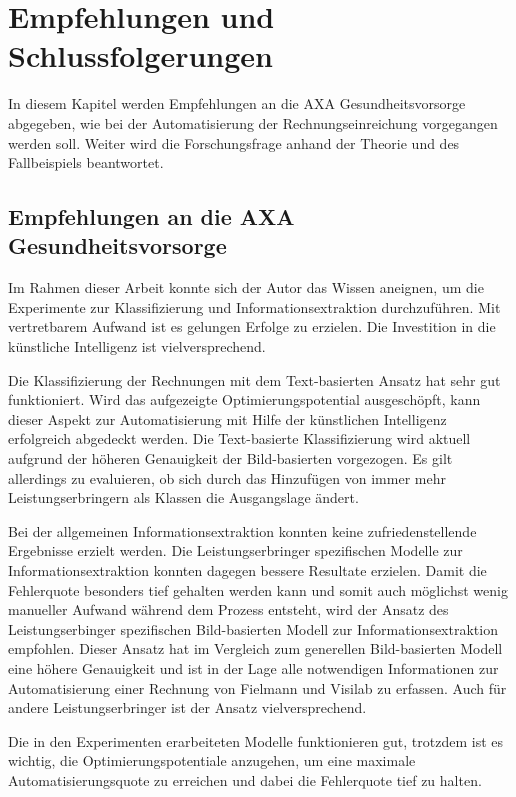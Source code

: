\section{Empfehlungen und Schlussfolgerungen}
\label{chap:summary}

In diesem Kapitel werden Empfehlungen an die AXA Gesundheitsvorsorge abgegeben, wie bei der Automatisierung der Rechnungseinreichung vorgegangen werden soll. Weiter wird die Forschungsfrage anhand der Theorie und des Fallbeispiels beantwortet.

\subsection{Empfehlungen an die AXA Gesundheitsvorsorge}

Im Rahmen dieser Arbeit konnte sich der Autor das Wissen aneignen, um die Experimente zur Klassifizierung und Informationsextraktion durchzuführen. Mit vertretbarem Aufwand ist es gelungen Erfolge zu erzielen. Die Investition in die künstliche Intelligenz ist vielversprechend.

Die Klassifizierung der Rechnungen mit dem Text-basierten Ansatz hat sehr gut funktioniert. Wird das aufgezeigte Optimierungspotential ausgeschöpft, kann dieser Aspekt zur Automatisierung mit Hilfe der künstlichen Intelligenz erfolgreich abgedeckt werden. Die Text-basierte Klassifizierung wird aktuell aufgrund der höheren Genauigkeit der Bild-basierten vorgezogen. Es gilt allerdings zu evaluieren, ob sich durch das Hinzufügen von immer mehr Leistungserbringern als Klassen die Ausgangslage ändert.

Bei der allgemeinen Informationsextraktion konnten keine zufriedenstellende Ergebnisse erzielt werden. Die Leistungserbringer spezifischen Modelle zur Informationsextraktion konnten dagegen bessere Resultate erzielen. Damit die Fehlerquote besonders tief gehalten werden kann und somit auch möglichst wenig manueller Aufwand während dem Prozess entsteht, wird der Ansatz des Leistungserbinger spezifischen Bild-basierten Modell zur Informationsextraktion empfohlen. Dieser Ansatz hat im Vergleich zum generellen Bild-basierten Modell eine höhere Genauigkeit und ist in der Lage alle notwendigen Informationen zur Automatisierung einer Rechnung von Fielmann und Visilab zu erfassen. Auch für andere Leistungserbringer ist der Ansatz vielversprechend.

Die in den Experimenten erarbeiteten Modelle funktionieren gut, trotzdem ist es wichtig, die Optimierungspotentiale anzugehen, um eine maximale Automatisierungsquote zu erreichen und dabei die Fehlerquote tief zu halten.

